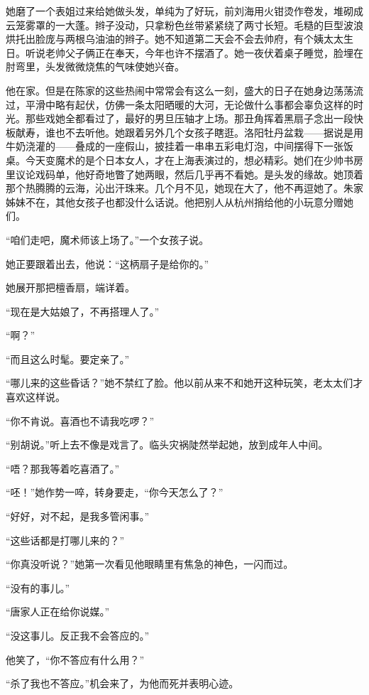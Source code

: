 \par 她磨了一个表姐过来给她做头发，单纯为了好玩，前刘海用火钳烫作卷发，堆砌成云笼雾罩的一大蓬。辫子没动，只拿粉色丝带紧紧绕了两寸长短。毛糙的巨型波浪烘托出脸庞与两根乌油油的辫子。她不知道第二天会不会去帅府，有个姨太太生日。听说老帅父子俩正在奉天，今年也许不摆酒了。她一夜伏着桌子睡觉，脸埋在肘弯里，头发微微烧焦的气味使她兴奋。
\par 他在家。但是在陈家的这些热闹中常常会有这么一刻，盛大的日子在她身边荡荡流过，平滑中略有起伏，仿佛一条太阳晒暖的大河，无论做什么事都会辜负这样的时光。那些戏她全都看过了，最好的男旦压轴才上场。那丑角挥着黑扇子念出一段快板献寿，谁也不去听他。她跟着另外几个女孩子瞎逛。洛阳牡丹盆栽——据说是用牛奶浇灌的——叠成的一座假山，披挂着一串串五彩电灯泡，中间摆得下一张饭桌。今天变魔术的是个日本女人，才在上海表演过的，想必精彩。她们在少帅书房里议论戏码单，他好奇地瞥了她两眼，然后几乎再不看她。是头发的缘故。她顶着那个热腾腾的云海，沁出汗珠来。几个月不见，她现在大了，他不再逗她了。朱家姊妹不在，其他女孩子也都没什么话说。他把别人从杭州捎给他的小玩意分赠她们。
\par “咱们走吧，魔术师该上场了。”一个女孩子说。
\par 她正要跟着出去，他说：“这柄扇子是给你的。”
\par 她展开那把檀香扇，端详着。
\par “现在是大姑娘了，不再搭理人了。”
\par “啊？”
\par “而且这么时髦。要定亲了。”
\par “哪儿来的这些昏话？”她不禁红了脸。他以前从来不和她开这种玩笑，老太太们才喜欢这样说。
\par “你不肯说。喜酒也不请我吃啰？”
\par “别胡说。”听上去不像是戏言了。临头灾祸陡然举起她，放到成年人中间。
\par “唔？那我等着吃喜酒了。”
\par “呸！”她作势一啐，转身要走，“你今天怎么了？”
\par “好好，对不起，是我多管闲事。”
\par “这些话都是打哪儿来的？”
\par “你真没听说？”她第一次看见他眼睛里有焦急的神色，一闪而过。
\par “没有的事儿。”
\par “唐家人正在给你说媒。”
\par “没这事儿。反正我不会答应的。”
\par 他笑了，“你不答应有什么用？”
\par “杀了我也不答应。”机会来了，为他而死并表明心迹。
